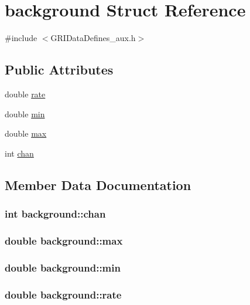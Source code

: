 \hypertarget{structbackground}{\section{background \-Struct \-Reference}
\label{structbackground}
}


{\ttfamily \#include $<$\-G\-R\-I\-Data\-Defines\-\_\-aux.\-h$>$}

\subsection*{\-Public \-Attributes}
\begin{DoxyCompactItemize}
\item 
double \hyperlink{structbackground_a8c3147cdcb48d30b6f476e56c81f858c}{rate}
\item 
double \hyperlink{structbackground_ab54eb5fed64dd4a2714341f5f56e60b4}{min}
\item 
double \hyperlink{structbackground_af4b3949e1e87de48c1eb312878934cff}{max}
\item 
int \hyperlink{structbackground_a7462666e51227c8105621e26ccb0b7a0}{chan}
\end{DoxyCompactItemize}


\subsection{\-Member \-Data \-Documentation}
\hypertarget{structbackground_a7462666e51227c8105621e26ccb0b7a0}{
\subsubsection[{chan}]{\setlength{\rightskip}{0pt plus 5cm}int {\bf background\-::chan}}}\label{structbackground_a7462666e51227c8105621e26ccb0b7a0}
\hypertarget{structbackground_af4b3949e1e87de48c1eb312878934cff}{
\subsubsection[{max}]{\setlength{\rightskip}{0pt plus 5cm}double {\bf background\-::max}}}\label{structbackground_af4b3949e1e87de48c1eb312878934cff}
\hypertarget{structbackground_ab54eb5fed64dd4a2714341f5f56e60b4}{
\subsubsection[{min}]{\setlength{\rightskip}{0pt plus 5cm}double {\bf background\-::min}}}\label{structbackground_ab54eb5fed64dd4a2714341f5f56e60b4}
\hypertarget{structbackground_a8c3147cdcb48d30b6f476e56c81f858c}{
\subsubsection[{rate}]{\setlength{\rightskip}{0pt plus 5cm}double {\bf background\-::rate}}}\label{structbackground_a8c3147cdcb48d30b6f476e56c81f858c}


